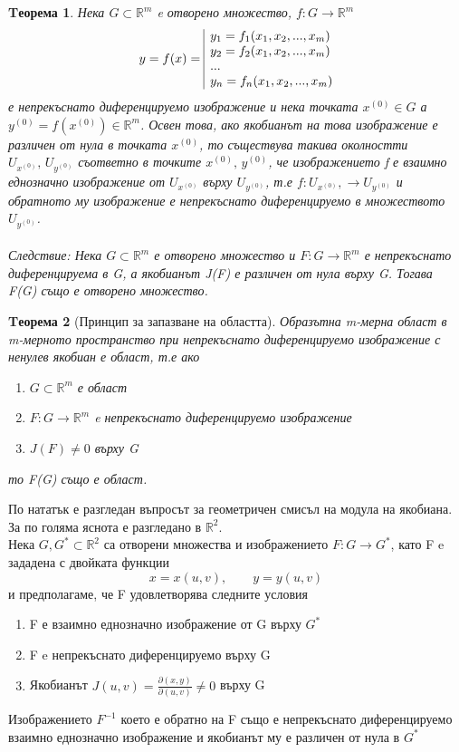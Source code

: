 \documentclass[a4paper,fleqn,12pt]{article}
\newtheorem{theorem}{Tеорема}[subsection]
\theoremstyle{definition}
\begin{document}
\begin{theorem}
Нека $G \subset \mathbb{R}^m$ e отворено множество, $f: G \to \mathbb{R}^m$
$$y = f(x) = 
\begin{array}{|l@{}}
y_1 = f_1(x_1, x_2, ..., x_m) \\
y_2 = f_2(x_1, x_2, ..., x_m) \\
...\\
y_n = f_n(x_1, x_2, ..., x_m) 
\end{array}$$
е непрекъснато диференцируемо изображение и нека точката $x^{(0)}  \in G $ а $ y^{(0)} = f(x^{(0)}) \in \mathbb{R}^m$.
Освен това, ако якобианът на това изображение е различен от нула в точката $x^{(0)}$, то съществува такива околностти $U_{x^{(0)}}, \, U_{y^{(0)}}$ съответно в точките $x^{(0)}, \, y^{(0)}$,
 че изображението f е взаимно еднозначно изображение от $U_{x^{(0)}}$ върху $U_{y^{(0)}}$, 
т.е $f: U_{x^{(0)}}, \to U_{y^{(0)}}$ и обратното му изображение е непрекъснато диференцируемо в множеството $ U_{y^{(0)}}$.
\\
\\
Следствие: Нека $G \subset \mathbb{R}^m$ е отворено множество и $F: G \to \mathbb{R}^m$ е непрекъснато диференцируема в G, а якобианът J(F) е различен от нула върху G. Тогава F(G) също е отворено множество. 
\end{theorem}

\begin{theorem}[Принцип за запазване на областта]
Образътна m-мерна област в m-мерното пространство при непрекъснато диференцируемо изображение с ненулев якобиан е област, т.е ако
\begin{enumerate}
\item $G \subset \mathbb{R}^m$ е област
\item $F: G \to \mathbb{R}^m$ e непрекъснато диференцируемо изображение
\item $J(F) \neq 0$ върху G
\end{enumerate}
то F(G) също е област. 
\end{theorem}
По нататък е разгледан въпросът за геометричен смисъл на модула на якобиана. За по голяма яснота е разгледано в $\mathbb{R}^2$. \\
Нека $G, G^* \subset \mathbb{R}^2$ са отворени множества и изображението $F: G \to G^*$, като F e зададена с двойката функции
$$x = x(u,v), \qquad y = y(u,v)$$
и предполагаме, че F удовлетворява следните условия
\begin{enumerate}
\item F е взаимно еднозначно изображение от G върху $G^*$
\item F e непрекъснато диференцируемо върху G
\item Якобианът $J(u,v) = \frac{\partial (x,y)}{\partial (u,v)} \neq 0$ върху G
\end{enumerate}
Изображението $F^{-1}$ което е обратно на F също е непрекъснато диференцируемо взаимно еднозначно изображение и якобианът му е различен от нула в $G^*$
\end{document}
